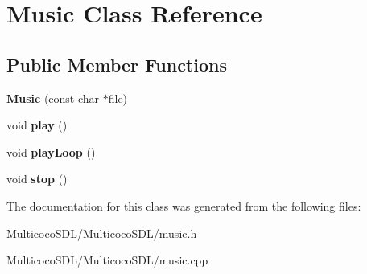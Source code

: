 \hypertarget{class_music}{\section{Music Class Reference}
\label{class_music}
}
\subsection*{Public Member Functions}
\begin{DoxyCompactItemize}
\item 
\hypertarget{class_music_a85decb61f24531a66bf3943945f3f40a}{{\bfseries Music} (const char $\ast$file)}\label{class_music_a85decb61f24531a66bf3943945f3f40a}

\item 
\hypertarget{class_music_a54b941f6f7634d7f99b473c78fe6e4da}{void {\bfseries play} ()}\label{class_music_a54b941f6f7634d7f99b473c78fe6e4da}

\item 
\hypertarget{class_music_a1cd9e6b64bfcaa6c75cfb62d1ddfe9b6}{void {\bfseries play\-Loop} ()}\label{class_music_a1cd9e6b64bfcaa6c75cfb62d1ddfe9b6}

\item 
\hypertarget{class_music_a008211b514c1c89c15399d3384d3fcea}{void {\bfseries stop} ()}\label{class_music_a008211b514c1c89c15399d3384d3fcea}

\end{DoxyCompactItemize}


The documentation for this class was generated from the following files\-:\begin{DoxyCompactItemize}
\item 
Multicoco\-S\-D\-L/\-Multicoco\-S\-D\-L/music.\-h\item 
Multicoco\-S\-D\-L/\-Multicoco\-S\-D\-L/music.\-cpp\end{DoxyCompactItemize}
